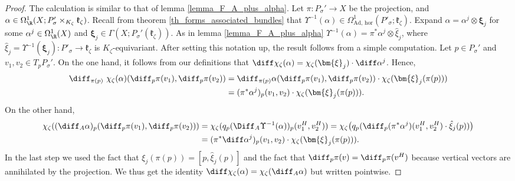 \begin{proof}
    The calculation is similar to that of lemma \ref{lemma_F_A_plus_alpha}. Let \(\pi\colon P_\sigma'\to X\) be the projection, and \(\alpha \in \Omega_\R^1(X; P_\sigma' \times_{K_\zeta} \mathfrak{k}_\zeta)\). Recall from theorem \ref{th_forms_associated_bundles} that \(\Upsilon^{-1}(\alpha) \in \Omega^1_{\text{Ad, hor}}(P'_\sigma; \mathfrak{k}_\zeta)\). Expand \(\alpha=\alpha^j \otimes \bm{\xi}_j\) for some \(\alpha^j \in \Omega_\R^1(X)\) and \(\bm{\xi}_j\in \Gamma(X; P_\sigma'(\mathfrak{k}_\zeta))\). As in lemma \ref{lemma_F_A_plus_alpha} \(\Upsilon^{-1}(\alpha)=\pi^* \alpha^j \otimes \hat{\xi}_j\), where \(\hat{\xi}_j=\Upsilon^{-1}(\bm{\xi}_j)\colon P'_\sigma \to \mathfrak{k}_\zeta\) is \(K_\zeta\)-equivariant. After setting this notation up, the result follows from a simple computation. Let \(p \in P_\sigma'\) and \(v_1, v_2 \in T_pP_\sigma'\). On the one hand, it follows from our definitions that \(\diff \chi_\zeta(\alpha)=\chi_\zeta(\bm{\xi}_j)\cdot\diff \alpha^j\). Hence, 
    \begin{align*}
        \diff_{\pi(p)}\ \chi_\zeta(\alpha) (\diff_p \pi(v_1), \diff_p\pi(v_2)) & = \diff_{\pi(p)} \alpha(\diff_p\pi(v_1), \diff_p\pi(v_2)) \cdot \chi_\zeta(\bm{\xi}_j(\pi(p)))\\
        &=(\pi^*\alpha^j)_p(v_1, v_2) \cdot \chi_\zeta(\bm{\xi}_j(\pi(p))).
    \end{align*} 
    On the other hand,
    \begin{align*}
        \chi_\zeta((\diff_A \alpha)_p(\diff_p\pi(v_1), \diff_p\pi(v_2))) & = \chi_\zeta(q_p( \Diff_A \Upsilon^{-1}(\alpha))_p(v_1^H, v_2^H)) = \chi_\zeta\big(q_p(\diff_p(\pi^* \alpha^j)(v_1^H,v_2^H)\cdot \hat{\xi}_j(p))\big) \\
        & = (\pi^* \diff\alpha^j)_p(v_1, v_2) \cdot \chi_\zeta(\bm{\xi}_j(\pi(p))).
    \end{align*}
    In the last step we used the fact that \(\xi_j(\pi(p))=[p, \hat{\xi}_j(p)]\) and the fact that \(\diff_p\pi(v)=\diff_p\pi(v^H)\) because vertical vectors are annihilated by the projection. We thus get the identity \(\diff \chi_\zeta(\alpha)=\chi_\zeta(\diff_A \alpha)\) but written pointwise.
\end{proof}

